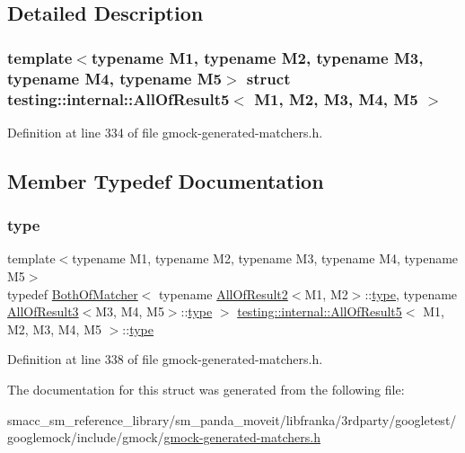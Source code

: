 \subsection{Detailed Description}
\subsubsection*{template$<$typename M1, typename M2, typename M3, typename M4, typename M5$>$\newline
struct testing\+::internal\+::\+All\+Of\+Result5$<$ M1, M2, M3, M4, M5 $>$}



Definition at line 334 of file gmock-\/generated-\/matchers.\+h.



\subsection{Member Typedef Documentation}
\mbox{\label{structtesting_1_1internal_1_1AllOfResult5_aee2e1fb803f428741d147347b692d108}} 
\subsubsection{\texorpdfstring{type}{type}}
{\footnotesize\ttfamily template$<$typename M1, typename M2, typename M3, typename M4, typename M5$>$ \\
typedef \hyperlink{classtesting_1_1internal_1_1BothOfMatcher}{Both\+Of\+Matcher}$<$ typename \hyperlink{structtesting_1_1internal_1_1AllOfResult2}{All\+Of\+Result2}$<$M1, M2$>$\+::\hyperlink{structtesting_1_1internal_1_1AllOfResult5_aee2e1fb803f428741d147347b692d108}{type}, typename \hyperlink{structtesting_1_1internal_1_1AllOfResult3}{All\+Of\+Result3}$<$M3, M4, M5$>$\+::\hyperlink{structtesting_1_1internal_1_1AllOfResult5_aee2e1fb803f428741d147347b692d108}{type} $>$ \hyperlink{structtesting_1_1internal_1_1AllOfResult5}{testing\+::internal\+::\+All\+Of\+Result5}$<$ M1, M2, M3, M4, M5 $>$\+::\hyperlink{structtesting_1_1internal_1_1AllOfResult5_aee2e1fb803f428741d147347b692d108}{type}}



Definition at line 338 of file gmock-\/generated-\/matchers.\+h.



The documentation for this struct was generated from the following file\+:\begin{DoxyCompactItemize}
\item 
smacc\+\_\+sm\+\_\+reference\+\_\+library/sm\+\_\+panda\+\_\+moveit/libfranka/3rdparty/googletest/googlemock/include/gmock/\hyperlink{gmock-generated-matchers_8h}{gmock-\/generated-\/matchers.\+h}\end{DoxyCompactItemize}
